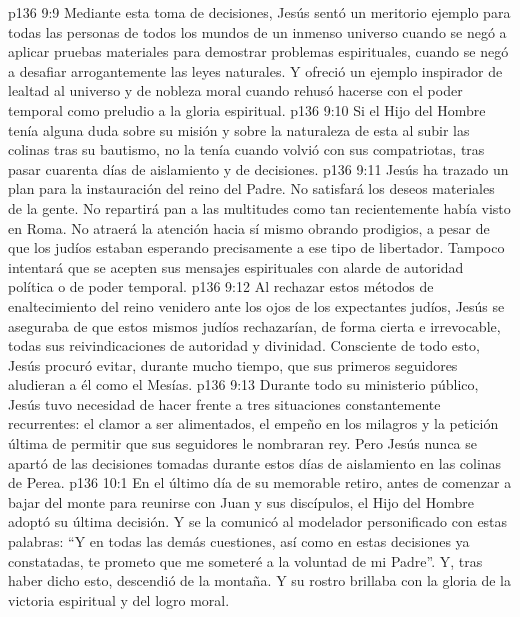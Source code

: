 \vs p136 9:9 \pc Mediante esta toma de decisiones, Jesús sentó un meritorio ejemplo para todas las personas de todos los mundos de un inmenso universo cuando se negó a aplicar pruebas materiales para demostrar problemas espirituales, cuando se negó a desafiar arrogantemente las leyes naturales. Y ofreció un ejemplo inspirador de lealtad al universo y de nobleza moral cuando rehusó hacerse con el poder temporal como preludio a la gloria espiritual.
\vs p136 9:10 \pc Si el Hijo del Hombre tenía alguna duda sobre su misión y sobre la naturaleza de esta al subir las colinas tras su bautismo, no la tenía cuando volvió con sus compatriotas, tras pasar cuarenta días de aislamiento y de decisiones.
\vs p136 9:11 Jesús ha trazado un plan para la instauración del reino del Padre. No satisfará los deseos materiales de la gente. No repartirá pan a las multitudes como tan recientemente había visto en Roma. No atraerá la atención hacia sí mismo obrando prodigios, a pesar de que los judíos estaban esperando precisamente a ese tipo de libertador. Tampoco intentará que se acepten sus mensajes espirituales con alarde de autoridad política o de poder temporal.
\vs p136 9:12 Al rechazar estos métodos de enaltecimiento del reino venidero ante los ojos de los expectantes judíos, Jesús se aseguraba de que estos mismos judíos rechazarían, de forma cierta e irrevocable, todas sus reivindicaciones de autoridad y divinidad. Consciente de todo esto, Jesús procuró evitar, durante mucho tiempo, que sus primeros seguidores aludieran a él como el Mesías.
\vs p136 9:13 Durante todo su ministerio público, Jesús tuvo necesidad de hacer frente a tres situaciones constantemente recurrentes: el clamor a ser alimentados, el empeño en los milagros y la petición última de permitir que sus seguidores le nombraran rey. Pero Jesús nunca se apartó de las decisiones tomadas durante estos días de aislamiento en las colinas de Perea.
\vs p136 10:1 En el último día de su memorable retiro, antes de comenzar a bajar del monte para reunirse con Juan y sus discípulos, el Hijo del Hombre adoptó su última decisión. Y se la comunicó al modelador personificado con estas palabras: “Y en todas las demás cuestiones, así como en estas decisiones ya constatadas, te prometo que me someteré a la voluntad de mi Padre”. Y, tras haber dicho esto, descendió de la montaña. Y su rostro brillaba con la gloria de la victoria espiritual y del logro moral.
